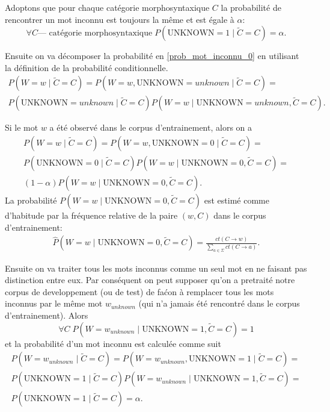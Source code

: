 \documentclass[12pt]{article}
\begin{document}
Adoptons que pour chaque cat\'egorie morphosyntaxique $C$ la probabilit\'e de rencontrer un mot inconnu est toujours la m\^eme et est \'egale \`a $\alpha$:
$$ \forall C \text{--- cat\'egorie morphosyntaxique} \; P(\mathrm{UNKNOWN} = 1 \mid \tilde{C} = C) = \alpha.$$

Ensuite on va d\'ecomposer la probabilit\'e en \ref{prob_mot_inconnu_0} en utilisant la d\'efinition de la probabilit\'e conditionnelle.
\begin{multline}
\label{prob_mot_inconnu_cond}
 P(W = w \mid \tilde{C} = C) = P(W = w, \mathrm{UNKNOWN} = unknown \mid \tilde{C} = C) = 
 \\
 P(\mathrm{UNKNOWN} = unknown \mid \tilde{C} = C) P(W = w \mid \mathrm{UNKNOWN} = unknown , \tilde{C} = C).
\end{multline}

 Si le mot $w$ a \'et\'e observ\'e dans le corpus d'entrainement, alors on a
\begin{multline}
\label{prob_mot_connu_1}
 P(W = w \mid \tilde{C} = C) = P(W = w, \mathrm{UNKNOWN} = 0 \mid \tilde{C} = C) = 
 \\
 P(\mathrm{UNKNOWN} = 0 \mid \tilde{C} = C) P(W = w \mid \mathrm{UNKNOWN} = 0, \tilde{C} = C) =
 \\
 (1 - \alpha) P(W = w \mid \mathrm{UNKNOWN} = 0, \tilde{C} = C).
\end{multline}
La probabilit\'e $P(W = w \mid \mathrm{UNKNOWN} = 0, \tilde{C} = C)$ est estim\'e 
comme d'habitude par la fr\'equence relative de la paire $(w, C)$ dans le corpus d'entrainement:
\begin{eqnarray*}
\hat{P}(W = w \mid \mathrm{UNKNOWN} = 0, \tilde{C} = C) =
\frac{ct(C \rightarrow w)}{\sum\limits_{a \in \Sigma}{ct(C \rightarrow a)}}.
\end{eqnarray*}

Ensuite on va traiter tous les mots inconnus comme un seul mot en ne faisant pas distinction entre eux. 
Par cons\'equent on peut supposer qu'on a pretrait\'e notre corpus de developpement (ou de test) de fa\'con \`a remplacer tous les mots inconnus par le m\^eme mot $w_{unknown}$ (qui n'a jamais \'et\'e rencontr\'e dans le corpus d'entrainement). Alors 
$$\forall C \; P(W = w_{unknown} \mid \mathrm{UNKNOWN} = 1, \tilde{C} = C) = 1$$
et la probabilit\'e d'un mot inconnu est calcul\'ee comme suit
\begin{multline}
\label{prob_mot_inconnu_1}
 P(W = w_{unknown} \mid \tilde{C} = C) = P(W = w_{unknown}, \mathrm{UNKNOWN} = 1 \mid \tilde{C} = C) =
 \\
 P(\mathrm{UNKNOWN} = 1 \mid \tilde{C} = C) P(W = w_{unknown} \mid \mathrm{UNKNOWN} = 1, \tilde{C} = C) =
 \\
 P(\mathrm{UNKNOWN} = 1 \mid \tilde{C} = C) = \alpha.
\end{multline}
\end{document}
